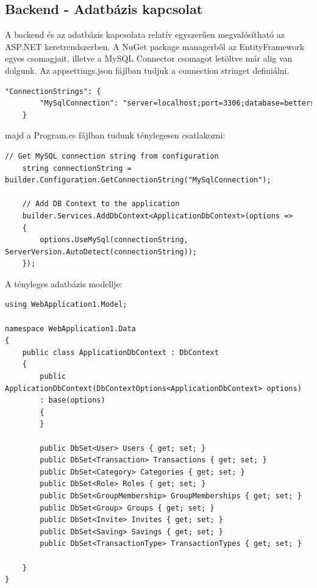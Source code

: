 \subsection{Backend - Adatbázis kapcsolat}
A backend és az adatbázis kapcsolata relatív egyszerűen megvalósítható az ASP.NET keretrendszerben.
A NuGet package managerből az EntityFramework egyes csomagjait,
illetve a MySQL Connector csomagot letöltve már alig van
dolgunk. Az appsettings.json fájlban tudjuk a connection
stringet definiálni.

\begin{lstlisting}[language={HTML}]
	"ConnectionStrings": {
		"MySqlConnection": "server=localhost;port=3306;database=betterspend;user=root;password=<<password>>;"
	}
\end{lstlisting}

majd a Program.cs fájlban tudunk ténylegesen csatlakozni:

\begin{lstlisting}[language={[Sharp]C}]
	// Get MySQL connection string from configuration
	string connectionString = builder.Configuration.GetConnectionString("MySqlConnection");
	
	// Add DB Context to the application
	builder.Services.AddDbContext<ApplicationDbContext>(options =>
	{
		options.UseMySql(connectionString, ServerVersion.AutoDetect(connectionString));
	});
\end{lstlisting}

A tényleges adatbázis modellje:

\begin{lstlisting}[language={[Sharp]C}]
using WebApplication1.Model;

namespace WebApplication1.Data
{
	public class ApplicationDbContext : DbContext
	{
		public ApplicationDbContext(DbContextOptions<ApplicationDbContext> options)
		: base(options)
		{
		}
		
		public DbSet<User> Users { get; set; }
		public DbSet<Transaction> Transactions { get; set; }
		public DbSet<Category> Categories { get; set; }
		public DbSet<Role> Roles { get; set; }
		public DbSet<GroupMembership> GroupMemberships { get; set; }
		public DbSet<Group> Groups { get; set; }
		public DbSet<Invite> Invites { get; set; }
		public DbSet<Saving> Savings { get; set; }
		public DbSet<TransactionType> TransactionTypes { get; set; }
		
	}
}
\end{lstlisting}

